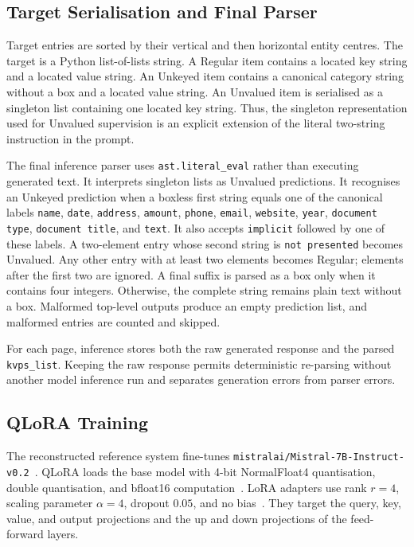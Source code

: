 \subsection{Target Serialisation and Final Parser}
\label{sec:mistral-prompt-output}

Target entries are sorted by their vertical and then horizontal entity centres.
The target is a Python list-of-lists string. A Regular item contains a located
key string and a located value string. An Unkeyed item contains a canonical
category string without a box and a located value string. An Unvalued item is
serialised as a singleton list containing one located key string. Thus, the
singleton representation used for Unvalued supervision is an explicit
extension of the literal two-string instruction in the prompt.

The final inference parser uses \texttt{ast.literal\_eval} rather than executing
generated text. It interprets singleton lists as Unvalued predictions. It
recognises an Unkeyed prediction when a boxless first string equals one of the
canonical labels \texttt{name}, \texttt{date}, \texttt{address},
\texttt{amount}, \texttt{phone}, \texttt{email}, \texttt{website},
\texttt{year}, \texttt{document type}, \texttt{document title}, and
\texttt{text}. It also accepts \texttt{implicit} followed by one of these
labels. A two-element entry whose second string is \texttt{not presented}
becomes Unvalued. Any other entry with at least two elements becomes Regular;
elements after the first two are ignored. A final suffix is parsed as a box
only when it contains four integers. Otherwise, the complete string remains
plain text without a box. Malformed top-level outputs produce an empty
prediction list, and malformed entries are counted and skipped.

For each page, inference stores both the raw generated response and the parsed
\texttt{kvps\_list}. Keeping the raw response permits deterministic re-parsing
without another model inference run and separates generation errors from
parser errors.

\subsection{QLoRA Training}
\label{sec:mistral-training}

The reconstructed reference system fine-tunes
\texttt{mistralai/}\linebreak[4]\texttt{Mistral-7B-Instruct-v0.2}~\cite{mistral}. QLoRA loads the
base model with 4-bit NormalFloat4 quantisation, double quantisation, and
bfloat16 computation~\cite{qlora}. LoRA adapters use rank $r=4$, scaling
parameter $\alpha=4$, dropout $0.05$, and no bias~\cite{lora}. They target the
query, key, value, and output projections and the up and down projections of
the feed-forward layers.

